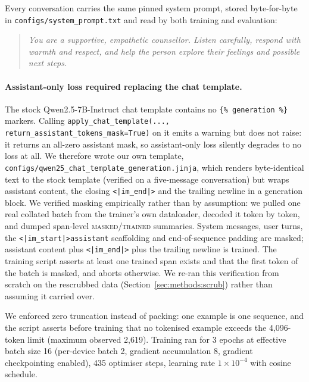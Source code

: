Every conversation carries the same pinned system prompt, stored byte-for-byte in
\texttt{configs/system\_prompt.txt} and read by both training and evaluation:

\begin{quote}
\itshape You are a supportive, empathetic counsellor. Listen carefully, respond with
warmth and respect, and help the person explore their feelings and possible next steps.
\end{quote}

\paragraph{Assistant-only loss required replacing the chat template.} The stock
Qwen2.5-7B-Instruct chat template contains no \texttt{\{\% generation \%\}} markers.
Calling \texttt{apply\_chat\_template(..., return\_assistant\_tokens\_mask=True)} on it
emits a warning but does not raise: it returns an all-zero assistant mask, so
assistant-only loss silently degrades to no loss at all. We therefore wrote our own
template, \texttt{configs/qwen25\_chat\_template\_generation.jinja}, which renders
byte-identical text to the stock template (verified on a five-message conversation) but
wraps assistant content, the closing \texttt{<|im\_end|>} and the trailing newline in a
generation block. We verified masking empirically rather than by assumption: we pulled
one real collated batch from the trainer's own dataloader, decoded it token by token,
and dumped span-level \textsc{masked}/\textsc{trained} summaries. System messages, user
turns, the \texttt{<|im\_start|>assistant} scaffolding and end-of-sequence padding are
masked; assistant content plus \texttt{<|im\_end|>} plus the trailing newline is trained.
The training script asserts at least one trained span exists and that the first token of
the batch is masked, and aborts otherwise. We re-ran this verification from scratch on
the rescrubbed data (Section~\ref{sec:methods:scrub}) rather than assuming it carried
over.

We enforced zero truncation instead of packing: one example is one sequence, and the
script asserts before training that no tokenised example exceeds the 4{,}096-token limit
(maximum observed 2{,}619). Training ran for 3 epochs at effective batch size 16
(per-device batch 2, gradient accumulation 8, gradient checkpointing enabled), 435
optimiser steps, learning rate $1\times10^{-4}$ with cosine schedule.

